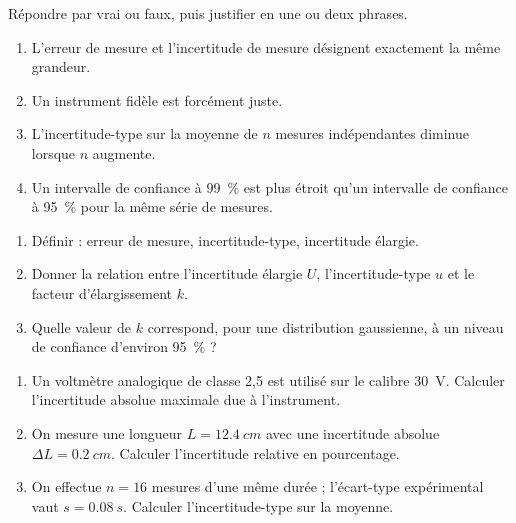 \documentclass[11pt]{article}
\newcounter{popsec}
\newcounter{popsub}
\newcommand{\courssub}[1]{%
  \stepcounter{popsub}%
  \par\vspace{9pt}\noindent{\popxbold\fontsize{11.5}{13}\selectfont\color{popink}{\color{poporange}\thepopsec.\thepopsub}\hspace{6pt}#1}\par\nopagebreak\vspace{4pt}
}
\begin{document}
\begin{exercice}
Répondre par vrai ou faux, puis justifier en une ou deux phrases.
\begin{enumerate}
\item L'erreur de mesure et l'incertitude de mesure désignent exactement la même grandeur.
\item Un instrument fidèle est forcément juste.
\item L'incertitude-type sur la moyenne de $n$ mesures indépendantes diminue lorsque $n$ augmente.
\item Un intervalle de confiance à \SI{99}{\%} est plus étroit qu'un intervalle de confiance à \SI{95}{\%} pour la même série de mesures.
\end{enumerate}
\end{exercice}

\begin{exercice}[Définitions]
\begin{enumerate}
\item Définir : erreur de mesure, incertitude-type, incertitude élargie.
\item Donner la relation entre l'incertitude élargie $U$, l'incertitude-type $u$ et le facteur d'élargissement $k$.
\item Quelle valeur de $k$ correspond, pour une distribution gaussienne, à un niveau de confiance d'environ \SI{95}{\%} ?
\end{enumerate}
\end{exercice}

\begin{exercice}
\begin{enumerate}
\item Un voltmètre analogique de classe 2,5 est utilisé sur le calibre \SI{30}{V}. Calculer l'incertitude absolue maximale due à l'instrument.
\item On mesure une longueur $L = \SI{12,4}{cm}$ avec une incertitude absolue $\Delta L = \SI{0,2}{cm}$. Calculer l'incertitude relative en pourcentage.
\item On effectue $n = 16$ mesures d'une même durée ; l'écart-type expérimental vaut $s = \SI{0,08}{s}$. Calculer l'incertitude-type sur la moyenne.
\end{enumerate}
\end{exercice}

\courssub{Je m'entraîne}
\end{document}
